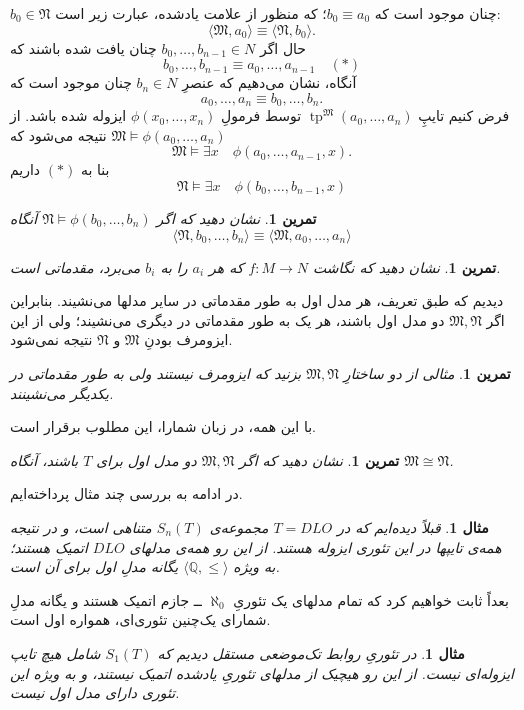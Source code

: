 \documentclass[12pt,a4paper]{article}
\theoremstyle{colorhead}
\newtheorem{tam}[thm]{تمرین}
\newtheorem{mesal}[thm]{مثال}
\DeclareMathOperator{\tp}{tp}
\begin{document}
$b_0\in \mathfrak{N}$
چنان موجود است که
$b_0\equiv a_0$؛
که منظور از علامت یادشده، عبارت زیر است:
\[
\langle \mathfrak{M},a_0\rangle\equiv \langle \mathfrak{N},b_0\rangle.
\]
حال اگر
$b_0,\ldots,b_{n-1}\in N$
چنان یافت شده باشند که
\[b_0,\ldots,b_{n-1}\equiv a_0,\ldots,a_{n-1}\quad (*)\] 
آنگاه، نشان می‌دهیم که عنصرِ
$b_n\in N$
چنان موجود است که
\[
a_0,\ldots,a_n\equiv b_0,\ldots,b_n.
\]
فرض کنیم تایپِ
$\tp^\mathfrak{M}(a_0,\ldots,a_n)$
توسط
فرمولِ
$\phi(x_0,\ldots,x_n)$
ایزوله شده باشد. از
\mbox{$\mathfrak{M}\models \phi(a_0,\ldots,a_n)$}
نتیجه می‌شود که
\[
\mathfrak{M}\models \exists x\quad \phi(a_0,\ldots,a_{n-1},x).\]
بنا به 
$(*)$
داریم
\[
\mathfrak{N}\models \exists x\quad \phi(b_0,\ldots,b_{n-1},x)\]
\begin{tam}
نشان دهید که اگر
$\mathfrak{N}\models \phi(b_0,\ldots,b_n)$
آنگاه 
\[
\langle \mathfrak{N}, b_0,\ldots,b_n\rangle\equiv \langle \mathfrak{M},a_0,\ldots,a_n\rangle\]
\end{tam}
\begin{tam}
نشان دهید که نگاشت
$f:M\to N$
که هر
$a_i$
را به
$b_i$
می‌برد، مقدماتی است. 
\end{tam}
دیدیم که طبق تعریف، هر مدل اول به طور مقدماتی در سایر مدلها می‌نشیند. بنابراین اگر
$\mathfrak{M},\mathfrak{N}$
دو مدل اول باشند، هر یک به طور مقدماتی در دیگری می‌نشیند؛ ولی از این ایزومرف بودنِ
$\mathfrak{M}$
و
$\mathfrak{N}$
نتیجه نمی‌شود.
\begin{tam}
مثالی از دو ساختارِ
$\mathfrak{
M},\mathfrak{N}$
بزنید که ایزومرف نیستند ولی به طور مقدماتی در یکدیگر می‌نشینند.
\end{tam}
با این همه، در زبان شمارا، این مطلوب برقرار است.
\begin{tam}
نشان دهید که اگر
$\mathfrak{M},\mathfrak{N}$
دو مدل اول برای
$T$
باشند، آنگاه
$\mathfrak{M}\cong \mathfrak{N}$.
\end{tam}
در ادامه به بررسی چند مثال پرداخته‌ایم. 
\begin{mesal}
قبلاً دیده‌ایم که در
$T=DLO$
مجموعه‌ی
$S_n(T)$
متناهی است، و در نتیجه همه‌ی تایپها در این تئوری ایزوله هستند. از این رو همه‌ی مدلهای
$DLO$
اتمیک هستند؛ به ویژه
$\langle\mathbb{Q},\leq\rangle$
یگانه مدلِ اول برای آن است. 
\end{mesal}
بعداً ثابت خواهیم کرد که تمام مدلهای یک تئوریِ
 $\aleph_0$ 
 ــ
جازم اتمیک هستند و یگانه مدلِ شمارای یک‌چنین تئوری‌ای، همواره اول است.
\begin{mesal}
در تئوریِ
روابط تک‌موضعی مستقل دیدیم که
$S_1(T)$
شامل هیچ تایپ ایزوله‌ای نیست. از این رو هیچیک از مدلهای تئوریِ یادشده اتمیک نیستند، و به ویژه این تئوری دارای مدل اول نیست.
\end{mesal}
\end{document}
